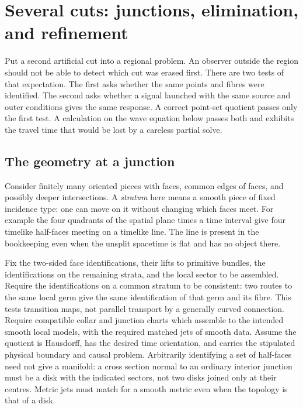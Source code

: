\chapter{Several cuts: junctions, elimination, and refinement}\label{ch:10}

Put a second artificial cut into a regional problem. An observer outside the region should not be able to detect which cut was erased first. There are two tests of that expectation. The first asks whether the same points and fibres were identified. The second asks whether a signal launched with the same source and outer conditions gives the same response. A correct point-set quotient passes only the first test. A calculation on the wave equation below passes both and exhibits the travel time that would be lost by a careless partial solve.

\section{The geometry at a junction}

Consider finitely many oriented pieces with faces, common edges of faces, and possibly deeper intersections. A \emph{stratum} here means a smooth piece of fixed incidence type: one can move on it without changing which faces meet. For example the four quadrants of the spatial plane times a time interval give four timelike half-faces meeting on a timelike line. The line is present in the bookkeeping even when the unsplit spacetime is flat and has no object there.

Fix the two-sided face identifications, their lifts to primitive bundles, the identifications on the remaining strata, and the local sector to be assembled. Require the identifications on a common stratum to be consistent: two routes to the same local germ give the same identification of that germ and its fibre. This tests transition maps, not parallel transport by a generally curved connection. Require compatible collar and junction charts which assemble to the intended smooth local models, with the required matched jets of smooth data. Assume the quotient is Hausdorff, has the desired time orientation, and carries the stipulated physical boundary and causal problem. Arbitrarily identifying a set of half-faces need not give a manifold: a cross section normal to an ordinary interior junction must be a disk with the indicated sectors, not two disks joined only at their centres. Metric jets must match for a smooth metric even when the topology is that of a disk.

